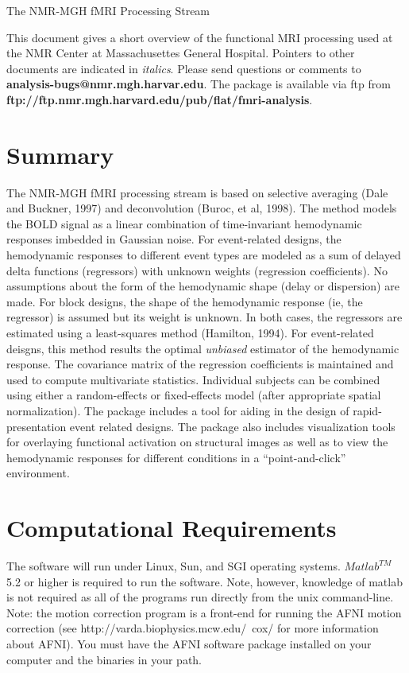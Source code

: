 \documentclass[10pt]{article}
\begin{document}
\begin{center}
{\LARGE The NMR-MGH fMRI Processing Stream}
\end{center}

This document gives a short overview of the functional MRI processing
used at the NMR Center at Massachusettes General Hospital.  Pointers
to other documents are indicated in {\em italics}.  Please send
questions or comments to {\bf analysis-bugs@nmr.mgh.harvar.edu}.  The
package is available via ftp from {\bf
ftp://ftp.nmr.mgh.harvard.edu/pub/flat/fmri-analysis}.

\section{Summary}

The NMR-MGH fMRI processing stream is based on selective averaging
(Dale and Buckner, 1997) and deconvolution (Buroc, et al, 1998).  The
method models the BOLD signal as a linear combination of
time-invariant hemodynamic responses imbedded in Gaussian noise.  For
event-related designs, the hemodynamic responses to different event
types are modeled as a sum of delayed delta functions (regressors)
with unknown weights (regression coefficients). No assumptions about
the form of the hemodynamic shape (delay or dispersion) are made.  For
block designs, the shape of the hemodynamic response (ie, the
regressor) is assumed but its weight is unknown.  In both cases, the
regressors are estimated using a least-squares method (Hamilton,
1994).  For event-related deisgns, this method results the optimal
{\em unbiased} estimator of the hemodynamic response.  The covariance
matrix of the regression coefficients is maintained and used to
compute multivariate statistics.  Individual subjects can be combined
using either a random-effects or fixed-effects model (after
appropriate spatial normalization).  The package includes a tool for
aiding in the design of rapid-presentation event related designs. The
package also includes visualization tools for overlaying functional
activation on structural images as well as to view the hemodynamic
responses for different conditions in a ``point-and-click''
environment.\\

\section{Computational Requirements}

The software will run under Linux, Sun, and SGI operating systems.
$Matlab^{TM}$ 5.2 or higher is required to run the software.  Note,
however, knowledge of matlab is not required as all of the programs
run directly from the unix command-line.  Note: the motion correction
program is a front-end for running the AFNI motion correction
(see http://varda.biophysics.mcw.edu/~cox/ for more information about
AFNI). You must have the AFNI software package installed on your
computer and the binaries in your path.  \\
\end{document}
